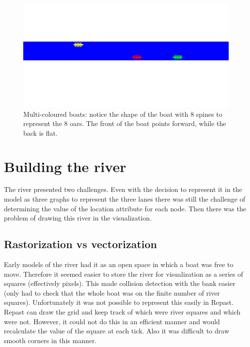       \begin{figure}
      \begin{center}
        \includegraphics[scale=0.3]{images/boats.png}
        \caption{Multi-coloured boats: notice the shape of the boat with 8 spines to represent the 8 oars. The front of the boat points forward, while the back is flat.}
        \label{techissues:fig:boats}
      \end{center}
      \end{figure}
  
  \section{Building the river}\label{techissues:river}
    The river presented two challenges. Even with the decision to represent it in the model as three graphs to represent the three lanes there was still the challenge of determining the value of the location attribute for each node. Then there was the problem of drawing this river in the visualization.
    
    \subsection{Rastorization vs vectorization}
      Early models of the river had it as an open space in which a
      boat was free to move. Therefore it seemed easier to store the
      river for visualization as a series of squares (effectively
      pixels). This made collision detection with the bank easier
      (only had to check that the whole boat was on the finite number
      of river squares). Unfortunately it was not possible to
      represent this easily in Repast. Repast can draw the grid and
      keep track of which were river squares and which were
      not. However, it could not do this in an efficient manner and
      would recalculate the value of the square at each tick. Also it
      was difficult to draw smooth corners in this manner.
      
